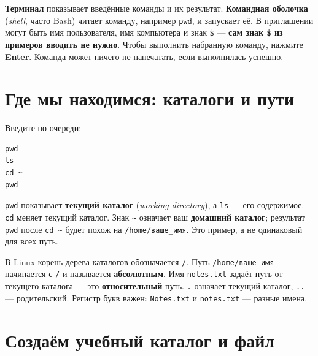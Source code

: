 \textbf{Терминал} показывает введённые команды и их результат.
\textbf{Командная оболочка} (\emph{shell}, часто Bash) читает команду,
например \texttt{pwd}, и запускает её. В приглашении могут быть имя
пользователя, имя компьютера и знак \texttt{\$} --- \textbf{сам знак
\texttt{\$} из примеров вводить не нужно}. Чтобы выполнить набранную
команду, нажмите \textbf{Enter}. Команда может ничего не напечатать,
если выполнилась успешно.

\hypertarget{ux433ux434ux435-ux43cux44b-ux43dux430ux445ux43eux434ux438ux43cux441ux44f-ux43aux430ux442ux430ux43bux43eux433ux438-ux438-ux43fux443ux442ux438}{%
\section{Где мы находимся: каталоги и
пути}\label{ux433ux434ux435-ux43cux44b-ux43dux430ux445ux43eux434ux438ux43cux441ux44f-ux43aux430ux442ux430ux43bux43eux433ux438-ux438-ux43fux443ux442ux438}}

Введите по очереди:

\begin{verbatim}
pwd
ls
cd ~
pwd
\end{verbatim}

\texttt{pwd} показывает \textbf{текущий каталог} (\emph{working
directory}), а \texttt{ls} --- его содержимое. \texttt{cd} меняет
текущий каталог. Знак \texttt{\textasciitilde{}} означает ваш
\textbf{домашний каталог}; результат \texttt{pwd} после
\texttt{cd\ \textasciitilde{}} будет похож на \texttt{/home/ваше\_имя}.
Это пример, а не одинаковый для всех путь.

В Linux корень дерева каталогов обозначается \texttt{/}. Путь
\texttt{/home/ваше\_имя} начинается с \texttt{/} и называется
\textbf{абсолютным}. Имя \texttt{notes.txt} задаёт путь от текущего
каталога --- это \textbf{относительный} путь. \texttt{.} означает
текущий каталог, \texttt{..} --- родительский. Регистр букв важен:
\texttt{Notes.txt} и \texttt{notes.txt} --- разные имена.

\hypertarget{ux441ux43eux437ux434ux430ux451ux43c-ux443ux447ux435ux431ux43dux44bux439-ux43aux430ux442ux430ux43bux43eux433-ux438-ux444ux430ux439ux43b}{%
\section{Создаём учебный каталог и
файл}\label{ux441ux43eux437ux434ux430ux451ux43c-ux443ux447ux435ux431ux43dux44bux439-ux43aux430ux442ux430ux43bux43eux433-ux438-ux444ux430ux439ux43b}}

